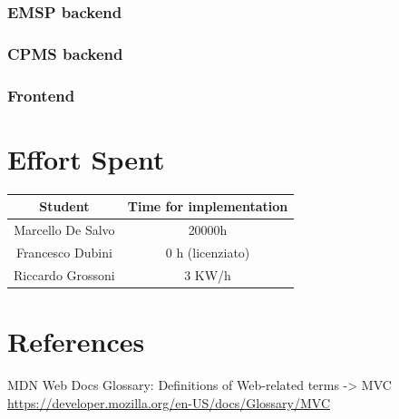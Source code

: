\documentclass[table, 12pt]{article}
\begin{document}
\subsubsection{EMSP backend}
\subsubsection{CPMS backend}
\subsubsection{Frontend}


\newpage
\section{Effort Spent}
    \begin{tabular}{|c||c|}
        \hline
        Student & Time for implementation\\ \hline
        Marcello De Salvo & 20000h  \\
        Francesco Dubini & 0 h (licenziato) \\
        Riccardo Grossoni & 3 KW/h \\
        \hline
    \end{tabular}


\section{References}


\begin{thebibliography}{9}
    MDN Web Docs Glossary: Definitions of Web-related terms -> MVC
    \url{https://developer.mozilla.org/en-US/docs/Glossary/MVC}

    
\end{thebibliography}
\end{document}
